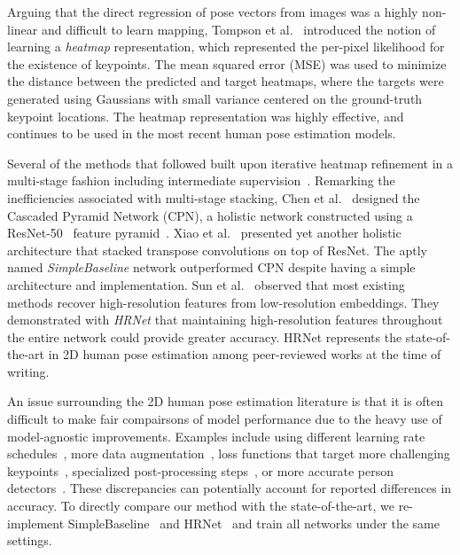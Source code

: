\documentclass[final]{cvpr}
\begin{document}
Arguing that the direct regression of pose vectors from images was a highly non-linear and difficult to learn mapping, Tompson et al.\ \cite{tompson2014joint} introduced the notion of learning a \textit{heatmap} representation, which represented the per-pixel likelihood for the existence of keypoints. The mean squared error (MSE) was used to minimize the distance between the predicted and target heatmaps, where the targets were generated using Gaussians with small variance centered on the ground-truth keypoint locations. The heatmap representation was highly effective, and continues to be used in the most recent human pose estimation models.

Several of the methods that followed built upon iterative heatmap refinement in a multi-stage fashion including intermediate supervision~\cite{wei2016convolutional, cao2017realtime, newell2016stacked}. Remarking the inefficiencies associated with multi-stage stacking, Chen et al.~\cite{chen2018cascaded} designed the Cascaded Pyramid Network (CPN), a holistic network constructed using a ResNet-50~\cite{he2016deep} feature pyramid~\cite{lin2017feature}. Xiao et al.\ \cite{xiao2018simple} presented yet another holistic architecture that stacked transpose convolutions on top of ResNet. The aptly named \textit{SimpleBaseline} network outperformed CPN despite having a simple architecture and implementation. Sun et al.\ \cite{sun2019deep} observed that most existing methods recover high-resolution features from low-resolution embeddings. They demonstrated with \textit{HRNet} that maintaining high-resolution features throughout the entire network could provide greater accuracy. HRNet represents the state-of-the-art in 2D human pose estimation among peer-reviewed works at the time of writing. 

An issue surrounding the 2D human pose estimation literature is that it is often difficult to make fair compairsons of model performance due to the heavy use of model-agnostic improvements. Examples include using different learning rate schedules~\cite{sun2019deep, li2019rethinking}, more data augmentation~\cite{li2019rethinking, bin2020adversarial}, loss functions that target more challenging keypoints~\cite{chen2018cascaded}, specialized post-processing steps~\cite{moon2019posefix, huang2020devil}, or more accurate person detectors~\cite{li2019rethinking, huang2020devil}. These discrepancies can potentially account for reported differences in accuracy. To directly compare our method with the state-of-the-art, we re-implement SimpleBaseline~\cite{xiao2018simple} and HRNet~\cite{sun2019deep} and train all networks under the same settings.
\end{document}
